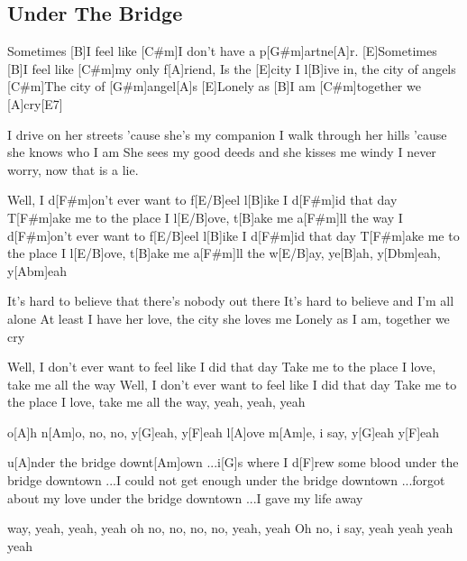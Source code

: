 \subsection*{Under The Bridge   }
\begin{guitar}
[E]Sometimes [B]I feel like [C#m]I don't have a p[G#m]artne[A]r.
[E]Sometimes [B]I feel like [C#m]my only f[A]riend,
Is the [E]city I l[B]ive in, the city of angels
[C#m]The city of [G#m]angel[A]s
[E]Lonely as [B]I am [C#m]together we [A]cry[E7]   
 


I drive on her streets 'cause she's my companion
I walk through her hills 'cause she knows who I am
She sees my good deeds and she kisses me windy
I never worry, now that is a lie.


Well, I d[F#m]on't ever want to f[E/B]eel l[B]ike I d[F#m]id that day
T[F#m]ake me to the place I l[E/B]ove, t[B]ake me a[F#m]ll the way
I d[F#m]on't ever want to f[E/B]eel l[B]ike I d[F#m]id that day
T[F#m]ake me to the place I l[E/B]ove, t[B]ake me a[F#m]ll the w[E/B]ay, ye[B]ah, y[Dbm]eah, y[Abm]eah



It's hard to believe that there's nobody out there
It's hard to believe and I'm all alone
At least I have her love, the city she loves me
Lonely as I am, together we cry


Well, I don't ever want to feel like I did that day
Take me to the place I love, take me all the way
Well, I don't ever want to feel like I did that day
Take me to the place I love, take me all the way, yeah, yeah, yeah



o[A]h n[Am]o, no, no, y[G]eah, y[F]eah
l[A]ove m[Am]e, i say, y[G]eah y[F]eah



u[A]nder the bridge downt[Am]own
...i[G]s where I d[F]rew some blood
under the bridge downtown
...I could not get enough
under the bridge downtown
...forgot about my love
under the bridge downtown
...I gave my life away



way, yeah, yeah, yeah
oh no, no, no, no, yeah, yeah
Oh no, i say, yeah yeah
              yeah yeah
\end{guitar}
